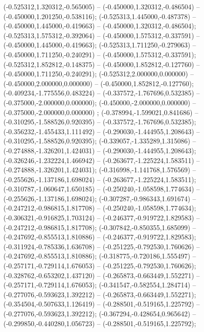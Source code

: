  (-0.525312,1.320312,-0.565005) -- (-0.450000,1.320312,-0.486504) -- (-0.450000,1.201250,-0.538116);
 (-0.525313,1.445000,-0.487378) -- (-0.450000,1.445000,-0.419663) -- (-0.450000,1.320312,-0.486504);
 (-0.525313,1.575312,-0.392064) -- (-0.450000,1.575312,-0.337591) -- (-0.450000,1.445000,-0.419663);
 (-0.525313,1.711250,-0.279063) -- (-0.450000,1.711250,-0.240291) -- (-0.450000,1.575312,-0.337591);
 (-0.525312,1.852812,-0.148375) -- (-0.450000,1.852812,-0.127760) -- (-0.450000,1.711250,-0.240291);
 (-0.525312,2.000000,0.000000) -- (-0.450000,2.000000,0.000000) -- (-0.450000,1.852812,-0.127760);
 (-0.409234,-1.775556,0.483224) -- (-0.337572,-1.767696,0.532385) -- (-0.375000,-2.000000,0.000000);
 (-0.450000,-2.000000,0.000000) -- (-0.375000,-2.000000,0.000000) ;
 (-0.378994,-1.599021,0.841686) -- (-0.310295,-1.588526,0.920395) -- (-0.337572,-1.767696,0.532385);
 (-0.356232,-1.455433,1.111492) -- (-0.290030,-1.444955,1.208643) -- (-0.310295,-1.588526,0.920395);
 (-0.339057,-1.335289,1.315086) -- (-0.274888,-1.326201,1.424031) -- (-0.290030,-1.444955,1.208643);
 (-0.326246,-1.232224,1.466942) -- (-0.263677,-1.225224,1.583511) -- (-0.274888,-1.326201,1.424031);
 (-0.316998,-1.141768,1.576569) -- (-0.255626,-1.137186,1.698024) -- (-0.263677,-1.225224,1.583511);
 (-0.310787,-1.060647,1.650185) -- (-0.250240,-1.058598,1.774634) -- (-0.255626,-1.137186,1.698024);
 (-0.307287,-0.986343,1.691674) -- (-0.247212,-0.986815,1.817708) -- (-0.250240,-1.058598,1.774634);
 (-0.306321,-0.916825,1.703124) -- (-0.246377,-0.919722,1.829583) -- (-0.247212,-0.986815,1.817708);
 (-0.307842,-0.850355,1.685099) -- (-0.247692,-0.855513,1.810886) -- (-0.246377,-0.919722,1.829583);
 (-0.311924,-0.785336,1.636708) -- (-0.251225,-0.792530,1.760626) -- (-0.247692,-0.855513,1.810886);
 (-0.318775,-0.720186,1.555497) -- (-0.257171,-0.729114,1.676053) -- (-0.251225,-0.792530,1.760626);
 (-0.328762,-0.653202,1.437120) -- (-0.265873,-0.663449,1.552271) -- (-0.257171,-0.729114,1.676053);
 (-0.341547,-0.582554,1.284714) -- (-0.277076,-0.593623,1.392212) -- (-0.265873,-0.663449,1.552271);
 (-0.354504,-0.507633,1.126419) -- (-0.288501,-0.519165,1.225792) -- (-0.277076,-0.593623,1.392212);
 (-0.367294,-0.428654,0.965642) -- (-0.299850,-0.440280,1.056723) -- (-0.288501,-0.519165,1.225792);
